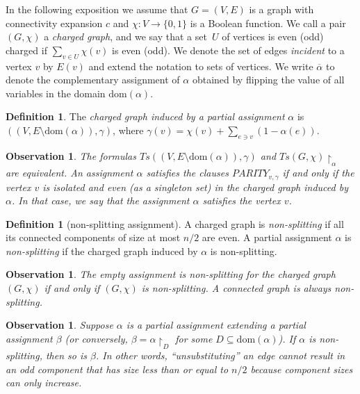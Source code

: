 \documentclass[11pt]{article}
\numberwithin{equation}{section}
\theoremstyle{definition}
\newtheorem{definition}[theorem]{Definition}
\theoremstyle{plain}
\theoremstyle{plain}
\newtheorem{observation}[theorem]{Observation}
\theoremstyle{definition}
\newcommand{\funcdescr}[3]{\ensuremath{ #1 : #2 \to #3}}
\newcommand{\domainof}[1]{\ensuremath{\mathrm{dom} ( #1 )}}
\newcommand{\edges}[1]{E( #1 )}
\newcommand{\set}[1]{\{ #1 \}}
\newcommand{\introduceterm}[1]{{\emph{#1}}}
\newcommand{\restrict}[2]{{{#1}\!\!\upharpoonright_{#2}}}
\newcommand{\formulaformat}[1]{\mathit{#1}}
\newcommand{\tseitinnot}[2]{\formulaformat{Ts}({#1,#2})}
\newcommand{\tseitinparity}[2]{\ensuremath{\formulaformat{PARITY}_{#1,#2}}}
\newcommand{\connectivityexpansionnot}{c}
\newcommand{\oppositeassignment}[1]{\overline{#1}}
\newcommand{\chargedgraph}{charged graph\xspace}
\newcommand{\inducedgraph}[1]{\chargedgraph induced by #1\xspace}
\newcommand{\nonsplitting}{non-splitting\xspace}
\newcommand{\nonsplittingassignment}{\nonsplitting assignment\xspace}
\newcommand{\Gnonsplittingnot}{non-splitting\xspace}
\newcommand{\Gnonsplitting}{\Gnonsplittingnot}
\newcommand{\tseitincharge}{\chi}
\begin{document}
In the following exposition we assume that $G=(V,E)$ is a graph with connectivity expansion $\connectivityexpansionnot$ and $\funcdescr{\tseitincharge}{V}{\set{0,1}}$ is a Boolean function. We call a pair $(G,\tseitincharge)$ a \introduceterm{\chargedgraph}, and we say that a %
set~$U$ of vertices
is even (odd) charged if $\sum_{v\in U}\tseitincharge(v)$ is even (odd).
We denote the set of edges \introduceterm{incident} to a vertex $v$ by $\edges{v}$ and extend the notation to sets of vertices.
We write
  $\oppositeassignment{\alpha}$
  to denote the complementary assignment
  of $\alpha$
  obtained by flipping the value of all
  variables in the domain
  $\domainof{\alpha}$.

\begin{definition}
  \label{def:induced-graph}
  The \emph{\chargedgraph induced by a partial assignment} $\alpha$ is $((V,E\setminus \domainof{\alpha}),\gamma)$, where $\gamma(v) = \tseitincharge(v) + \sum_{e \ni v}(1 - \alpha(e))$.
\end{definition}

\begin{observation}
  \label{obs:induced-graph-and-assignments}
  The formulas $\tseitinnot{(V,E\setminus \domainof{\alpha})}{\gamma}$ and $\restrict{\tseitinnot{G}{\tseitincharge}}{\alpha}$ are equivalent. An assignment $\alpha$ satisfies the clauses $\tseitinparity{v}{\gamma}$ if and only if the vertex $v$ is isolated and even (as a singleton set) in the \inducedgraph{$\alpha$}. In that case, we say that the assignment $\alpha$ satisfies the vertex $v$.
\end{observation}

\begin{definition}[\nonsplittingassignment]
  \label{def:non-splitting-assignment} A \chargedgraph is \introduceterm{\Gnonsplittingnot} if all its connected components of size at most $n/2$ are even. A partial assignment $\alpha$ is \emph{\nonsplitting} if the \inducedgraph{$\alpha$} is \Gnonsplitting.
\end{definition}

\begin{observation}
 \label{obs:empty-assignment}
 The empty assignment is \nonsplitting for the \chargedgraph
 $(G,\tseitincharge)$ if and only if $(G,\tseitincharge)$ is \Gnonsplittingnot. A connected graph is always \Gnonsplittingnot.
\end{observation}

\begin{observation}
 \label{obs:restriction-non-splitting}
 Suppose $\alpha$ is a partial assignment extending a partial assignment $\beta$ (or conversely, $\beta = \restrict{\alpha}{D}$ for some $D \subseteq \domainof{\alpha}$). If $\alpha$ is \nonsplitting, then so is $\beta$. In other words, ``unsubstituting'' an edge cannot result in an odd component that has size less than or equal to $n/2$ because component sizes can only increase.
\end{observation}
\end{document}
